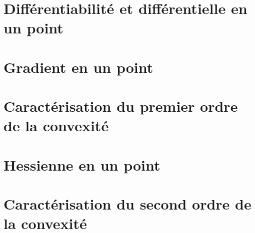 \documentclass[11pt, a4paper]{article}
\begin{document}
\section{Différentiabilité et différentielle en un point}
\label{sec:diffetdiff}

\section{Gradient en un point}
\label{sec:gradient}

\section{Caractérisation du premier ordre de la convexité}
\label{sec:caract1convexite}

\section{Hessienne en un point}
\label{sec:hessienne}

\section{Caractérisation du second ordre de la convexité}
\label{sec:caract2convexite}
\end{document}
